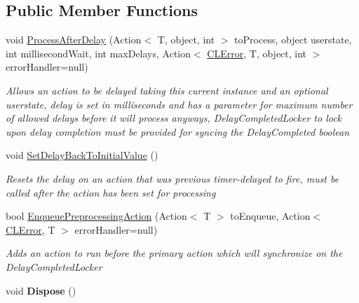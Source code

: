 \subsection*{Public Member Functions}
\begin{DoxyCompactItemize}
\item 
void \hyperlink{class_cloud_api_public_1_1_support_1_1_delay_processable_3_01_t_01_4_a47cd6a17c9843df529772a9bef6448e9}{Process\-After\-Delay} (Action$<$ T, object, int $>$ to\-Process, object userstate, int millisecond\-Wait, int max\-Delays, Action$<$ \hyperlink{class_cloud_api_public_1_1_model_1_1_c_l_error}{C\-L\-Error}, T, object, int $>$ error\-Handler=null)
\begin{DoxyCompactList}\small\item\em Allows an action to be delayed taking this current instance and an optional userstate, delay is set in milliseconds and has a parameter for maximum number of allowed delays before it will process anyways, Delay\-Completed\-Locker to lock upon delay completion must be provided for syncing the Delay\-Completed boolean \end{DoxyCompactList}\item 
void \hyperlink{class_cloud_api_public_1_1_support_1_1_delay_processable_3_01_t_01_4_a8ecab231a548e65ad98166d1f41219d7}{Set\-Delay\-Back\-To\-Initial\-Value} ()
\begin{DoxyCompactList}\small\item\em Resets the delay on an action that was previous timer-\/delayed to fire, must be called after the action has been set for processing \end{DoxyCompactList}\item 
bool \hyperlink{class_cloud_api_public_1_1_support_1_1_delay_processable_3_01_t_01_4_a50d3160dd04f8b88dd660df4360d27ac}{Enqueue\-Preprocessing\-Action} (Action$<$ T $>$ to\-Enqueue, Action$<$ \hyperlink{class_cloud_api_public_1_1_model_1_1_c_l_error}{C\-L\-Error}, T $>$ error\-Handler=null)
\begin{DoxyCompactList}\small\item\em Adds an action to run before the primary action which will synchronize on the Delay\-Completed\-Locker \end{DoxyCompactList}\item 
\hypertarget{class_cloud_api_public_1_1_support_1_1_delay_processable_3_01_t_01_4_a3cde7a9a740641039fb85cb016f6c89d}{void {\bfseries Dispose} ()}\label{class_cloud_api_public_1_1_support_1_1_delay_processable_3_01_t_01_4_a3cde7a9a740641039fb85cb016f6c89d}

\end{DoxyCompactItemize}
